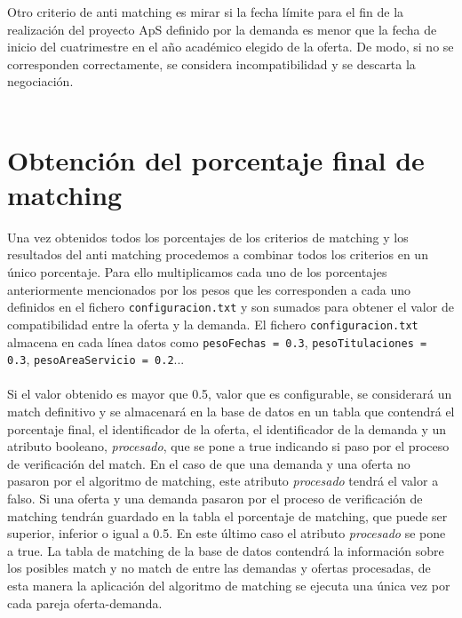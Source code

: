 \documentclass[11pt]{book}
\begin{document}
Otro criterio de anti matching es mirar si la fecha límite para el fin de la realización del proyecto ApS definido por la demanda es menor que la fecha de inicio del cuatrimestre en el año académico elegido de la oferta. De modo, si no se corresponden correctamente, se considera incompatibilidad y se descarta la negociación. \\\\



\section{Obtención del porcentaje final de matching}

Una vez obtenidos todos los porcentajes de los criterios de matching y los resultados del anti matching procedemos a combinar todos los criterios en un único porcentaje. Para ello multiplicamos cada uno de los porcentajes anteriormente mencionados por los pesos que les corresponden a cada uno definidos en el fichero \texttt{configuracion.txt} y son sumados para obtener el valor de compatibilidad entre la oferta y la demanda. El fichero \texttt{configuracion.txt} almacena en cada línea datos como \texttt{pesoFechas = 0.3}, \texttt{pesoTitulaciones = 0.3}, \texttt{pesoAreaServicio = 0.2}...  \\\\

Si el valor obtenido es mayor que 0.5, valor que es configurable, se considerará un match definitivo y se almacenará en la base de datos en un tabla que contendrá el porcentaje final, el identificador de la oferta, el identificador de la demanda y un atributo booleano, \emph{procesado}, que se pone a true indicando si paso por el proceso de verificación del match. En el caso de que una demanda y una oferta no pasaron por el algoritmo de matching, este atributo \emph{procesado} tendrá el valor a falso. Si una oferta y una demanda pasaron por el proceso de verificación de matching tendrán guardado en la tabla el porcentaje de matching, que puede ser superior, inferior o igual a 0.5. En este último caso el atributo \emph{procesado} se pone a true. La tabla de matching de la base de datos contendrá la información sobre los posibles match y no match de entre las demandas y ofertas procesadas, de esta manera la aplicación del algoritmo de matching se ejecuta una única vez por cada pareja oferta-demanda. \\\\
\end{document}
